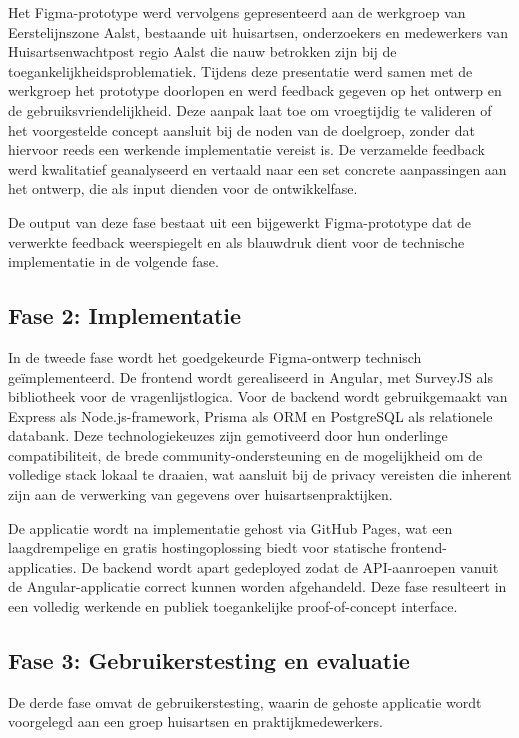 Het Figma-prototype werd vervolgens gepresenteerd aan de werkgroep van Eerstelijnszone Aalst, 
bestaande uit huisartsen, onderzoekers en medewerkers van Huisartsenwachtpost regio Aalst die nauw betrokken zijn bij de toegankelijkheidsproblematiek. 
Tijdens deze presentatie werd samen met de werkgroep het prototype doorlopen en werd feedback gegeven op het ontwerp en de gebruiksvriendelijkheid. 
Deze aanpak laat toe om vroegtijdig te valideren of het voorgestelde concept aansluit bij de noden van de doelgroep, zonder dat hiervoor reeds een werkende implementatie vereist is. 
De verzamelde feedback werd kwalitatief geanalyseerd en vertaald naar een set concrete aanpassingen aan het ontwerp, die als input dienden voor de ontwikkelfase.
\medskip

De output van deze fase bestaat uit een bijgewerkt Figma-prototype dat de verwerkte feedback weerspiegelt en als blauwdruk dient voor de technische implementatie in de volgende fase.

\subsection{Fase 2: Implementatie}
\label{ter:Implementatie}
In de tweede fase wordt het goedgekeurde Figma-ontwerp technisch geïmplementeerd. 
De frontend wordt gerealiseerd in Angular, met SurveyJS als bibliotheek voor de vragenlijstlogica. 
Voor de backend wordt gebruikgemaakt van Express als Node.js-framework, Prisma als ORM en PostgreSQL als relationele databank. 
Deze technologiekeuzes zijn gemotiveerd door hun onderlinge compatibiliteit, de brede community-ondersteuning en de mogelijkheid om de volledige stack lokaal te draaien, wat aansluit bij de privacy vereisten die inherent zijn aan de verwerking van gegevens over huisartsenpraktijken.
\medskip

De applicatie wordt na implementatie gehost via GitHub Pages, wat een laagdrempelige en gratis hostingoplossing biedt voor statische frontend-applicaties. 
De backend wordt apart gedeployed zodat de API-aanroepen vanuit de Angular-applicatie correct kunnen worden afgehandeld. 
Deze fase resulteert in een volledig werkende en publiek toegankelijke proof-of-concept interface.
\subsection{Fase 3: Gebruikerstesting en evaluatie}
\label{ter:testing}

De derde fase omvat de gebruikerstesting, waarin de gehoste applicatie wordt voorgelegd 
aan een groep huisartsen en praktijkmedewerkers.

